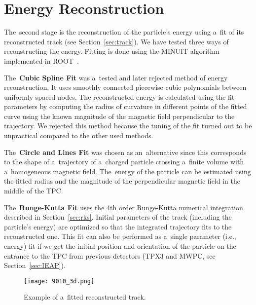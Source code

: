 \chapter{Energy Reconstruction}
\label{sec:energy}
	The~second stage is the reconstruction of the particle's energy using a~fit of its reconstructed track (see Section~\ref{sec:track}). We have tested three ways of reconstructing the energy. Fitting is done using the MINUIT algorithm implemented in ROOT~\cite{ROOT}.
	
	The~\textbf{Cubic Spline Fit} was a~tested and later rejected method of energy reconstruction. It uses smoothly connected piecewise cubic polynomials between uniformly spaced nodes. The reconstructed energy is calculated using the fit parameters by computing the radius of curvature in different points of the fitted curve using the known magnitude of the magnetic field perpendicular to the trajectory. We rejected this method because the tuning of the fit turned out to be unpractical compared to the other used methods.
	
	The~\textbf{Circle and Lines Fit} was chosen as an~alternative since this corresponds to the shape of a~trajectory of a~charged particle crossing a~finite volume with a~homogeneous magnetic field. The~energy of the particle can be estimated using the fitted radius and the magnitude of the perpendicular magnetic field in the middle of the \ac{TPC}.
	
	The~\textbf{Runge-Kutta Fit} uses the 4th order Runge-Kutta numerical integration described in Section~\ref{sec:rks}. Initial parameters of the track (including the particle's energy) are optimized so that the integrated trajectory fits to the reconstructed one. This fit can also be performed as a~single parameter (i.e., energy) fit if we get the initial position and orientation of the particle on the entrance to the \ac{TPC} from previous detectors (\ac{TPX3} and \ac{MWPC}, see Section~\ref{sec:IEAP}).
	
	\begin{figure}
		\centering
		\texttt{[image: 9010\_3d.png]}
		\caption{Example of a~fitted reconstructed track.}
		\label{fig:90103d}
	\end{figure}
	

